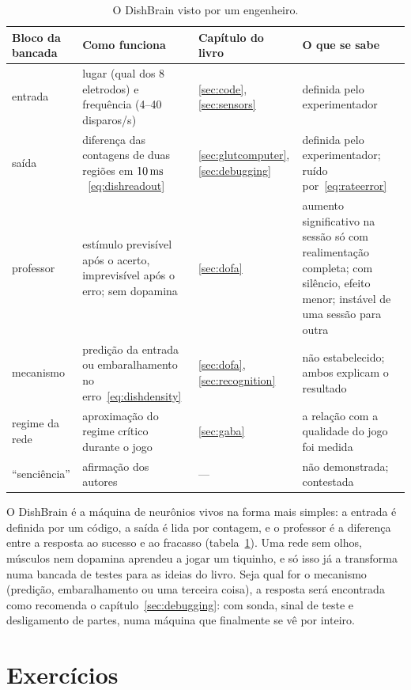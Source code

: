 \begin{table}[t]
\centering
\footnotesize
\setlength{\tabcolsep}{4pt}
\renewcommand{\arraystretch}{1.15}
\begin{tabular}{>{\raggedright}p{2.1cm}>{\raggedright}p{4.2cm}>{\raggedright}p{1.9cm}>{\raggedright\arraybackslash}p{4.6cm}}
\toprule
Bloco da bancada & Como funciona & Capítulo do livro & O que se sabe \\
\midrule
entrada & lugar (qual dos 8 eletrodos) e frequência (4--40 disparos/s) & \ref{sec:code}, \ref{sec:sensors} & definida pelo experimentador \\
saída & diferença das contagens de duas regiões em $10\,\text{ms}$~\eqref{eq:dishreadout} & \ref{sec:glutcomputer}, \ref{sec:debugging} & definida pelo experimentador; ruído por~\eqref{eq:rateerror} \\
professor & estímulo previsível após o acerto, imprevisível após o erro; sem dopamina & \ref{sec:dofa} & aumento significativo na sessão só com realimentação completa; com silêncio, efeito menor; instável de uma sessão para outra \\
mecanismo & predição da entrada ou embaralhamento no erro~\eqref{eq:dishdensity} & \ref{sec:dofa}, \ref{sec:recognition} & não estabelecido; ambos explicam o resultado \\
regime da rede & aproximação do regime crítico durante o jogo & \ref{sec:gaba} & a relação com a qualidade do jogo foi medida \\
``senciência'' & afirmação dos autores & --- & não demonstrada; contestada \\
\bottomrule
\end{tabular}
\caption{O DishBrain visto por um engenheiro.}
\label{tab:dishbrain}
\end{table}

O DishBrain é a máquina de neurônios vivos na forma mais simples: a entrada é definida por um código, a saída é lida por contagem, e o professor é a diferença entre a resposta ao sucesso e ao fracasso (tabela~\ref{tab:dishbrain}). Uma rede sem olhos, músculos nem dopamina aprendeu a jogar um tiquinho, e só isso já a transforma numa bancada de testes para as ideias do livro. Seja qual for o mecanismo (predição, embaralhamento ou uma terceira coisa), a resposta será encontrada como recomenda o capítulo~\ref{sec:debugging}: com sonda, sinal de teste e desligamento de partes, numa máquina que finalmente se vê por inteiro.

\section{Exercícios}

